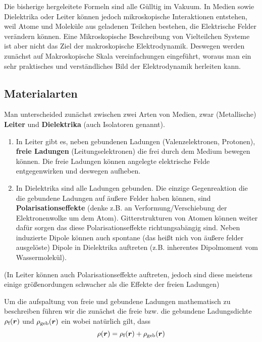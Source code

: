 Die bisherige hergeleitete Formeln sind alle Gülltig im Vakuum. In Medien
sowie Dielektrika oder Leiter können jedoch mikroskopische Interaktionen
entstehen, weil Atome und Moleküle aus geladenen Teilchen bestehen, die
Elektrische Felder verändern können. 
Eine Mikroskopische Beschreibung von Vielteilchen Systeme ist aber nicht
das Ziel der makroskopische Elektrodynamik. 
Deswegen werden zunächst auf Makroskopische Skala
vereinfachungen eingeführt, woraus man ein sehr 
praktisches und verständliches Bild der Elektrodynamik herleiten kann.

\subsection{Materialarten}%
Man unterscheided zunächst zwischen zwei Arten von Medien, zwar 
(Metallische) 
\textbf{Leiter} und \textbf{Dielektrika} (auch Isolatoren genannt). 

\begin{enumerate}
  \item In Leiter gibt es, 
neben gebundenen Ladungen (Valenzelektronen, Protonen), 
\textbf{freie Ladungen} (Leitungselektronen) die 
frei durch dem Medium bewegen können. Die freie Ladungen können angelegte
elektrische Felde entgegenwirken und deswegen aufheben.
  \item In Dielektrika sind alle Ladungen gebunden. Die einzige Gegenreaktion 
    die die gebundene Ladungen auf äußere Felder haben können, 
sind \textbf{Polarisationseffekte} (denke z.B. an Verformung/Verschiebung der 
Elektronenwolke um dem Atom). Gitterstrukturen von Atomen können weiter
dafür sorgen das diese Polarisationseffekte richtungsabängig sind. Neben
induzierte Dipole können auch spontane (das heißt nich von äußere felder
ausgelöste) Dipole in Dielektrika auftreten (z.B. inherentes 
Dipolmoment vom Wassermolekül).
\end{enumerate}
(In Leiter können auch Polarisationseffekte auftreten, jedoch sind diese
meistens einige größenordungen schwacher als die Effekte der freien Ladungen)

Um die aufspaltung von freie und gebundene Ladungen mathematisch zu 
beschreiben
führen wir die zunächst die freie bzw. die gebundene Ladungsdichte 
$\rho_\text{f}(\vb*r)$ und $\rho_\text{geb}(\vb*r)$ ein 
wobei natürlich gilt, dass
\begin{equation}
  \label{eq:ladungsdiche-geb-frei}
  \rho(\vb*r) = \rho_\text{f}(\vb*r) + \rho_\text{geb}(\vb*r)
\end{equation}


